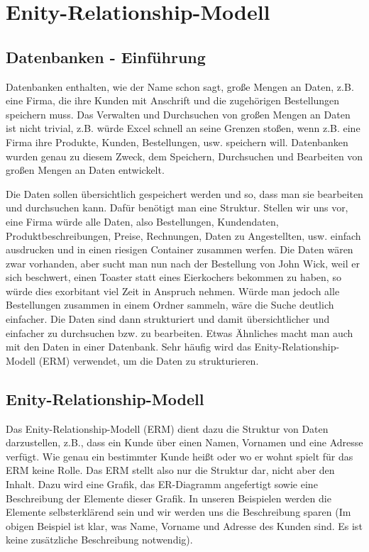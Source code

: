 \section[Enity-Relationship-Modell]{Enity-Relationship-Modell}
\subsection[Datenbanken]{Datenbanken - Einführung}
Datenbanken enthalten, wie der Name schon sagt, große Mengen an Daten, z.B. eine Firma, die ihre Kunden mit Anschrift und die zugehörigen Bestellungen speichern muss. Das Verwalten und Durchsuchen von großen Mengen an Daten ist nicht trivial, z.B. würde Excel schnell an seine Grenzen stoßen, wenn z.B. eine Firma ihre Produkte, Kunden, Bestellungen, usw. speichern will. Datenbanken wurden genau zu diesem Zweck, dem Speichern, Durchsuchen und Bearbeiten von großen Mengen an Daten entwickelt.

Die Daten sollen übersichtlich gespeichert werden und so, dass man sie bearbeiten und durchsuchen kann. Dafür benötigt man eine Struktur. Stellen wir uns vor, eine Firma würde alle Daten, also Bestellungen, Kundendaten, Produktbeschreibungen, Preise, Rechnungen, Daten zu Angestellten, usw. einfach ausdrucken und in einen riesigen Container zusammen werfen. Die Daten wären zwar vorhanden, aber sucht man nun nach der Bestellung von John Wick, weil er sich beschwert, einen Toaster statt eines Eierkochers bekommen zu haben, so würde dies exorbitant viel Zeit in Anspruch nehmen. Würde man jedoch alle Bestellungen zusammen in einem Ordner sammeln, wäre die Suche deutlich einfacher. Die Daten sind dann strukturiert und damit übersichtlicher und einfacher zu durchsuchen bzw. zu bearbeiten. Etwas Ähnliches macht man auch mit den Daten in einer Datenbank. Sehr häufig wird das Enity-Relationship-Modell (ERM) verwendet, um die Daten zu strukturieren.
\subsection[Grundlagen]{Enity-Relationship-Modell}
Das Enity-Relationship-Modell (ERM) dient dazu die Struktur von Daten darzustellen, z.B., dass ein Kunde über einen Namen, Vornamen und eine Adresse verfügt. Wie genau ein bestimmter Kunde heißt oder wo er wohnt spielt für das ERM keine Rolle. Das ERM stellt also nur die Struktur dar, nicht aber den Inhalt. Dazu wird eine Grafik, das ER-Diagramm angefertigt sowie eine Beschreibung der Elemente dieser Grafik. In unseren Beispielen werden die Elemente selbsterklärend sein und wir werden uns die Beschreibung sparen (Im obigen Beispiel ist klar, was Name, Vorname und Adresse des Kunden sind. Es ist keine zusätzliche Beschreibung notwendig).

